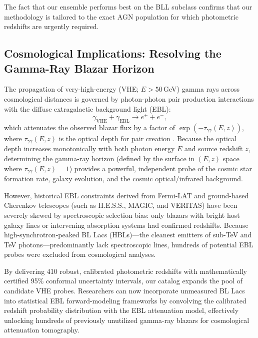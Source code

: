 \documentclass[twocolumn,linenumbers,floatfix]{aastex701}
\begin{document}
The fact that our ensemble performs best on the BLL subclass confirms that our methodology is tailored to the exact AGN population for which photometric redshifts are urgently required.

\subsection{Cosmological Implications: Resolving the Gamma-Ray Blazar Horizon}
\label{subsec:ebl_implications}

The propagation of very-high-energy (VHE; $E > 50$\,GeV) gamma rays across cosmological distances is governed by photon-photon pair production interactions with the diffuse extragalactic background light (EBL):
\begin{equation}
\gamma_{\text{VHE}} + \gamma_{\text{EBL}} \to e^+ + e^-,
\end{equation}
which attenuates the observed blazar flux by a factor of $\exp(-\tau_{\gamma\gamma}(E, z))$, where $\tau_{\gamma\gamma}(E, z)$ is the optical depth for pair creation \citep{Gould1967, Dominguez2011, Biteau2015}. Because the optical depth increases monotonically with both photon energy $E$ and source redshift $z$, determining the gamma-ray horizon (defined by the surface in $(E, z)$ space where $\tau_{\gamma\gamma}(E, z) = 1$) provides a powerful, independent probe of the cosmic star formation rate, galaxy evolution, and the cosmic optical/infrared background.

However, historical EBL constraints derived from Fermi-LAT and ground-based Cherenkov telescopes (such as H.E.S.S., MAGIC, and VERITAS) have been severely skewed by spectroscopic selection bias: only blazars with bright host galaxy lines or intervening absorption systems had confirmed redshifts. Because high-synchrotron-peaked BL Lacs (HBLs)---the cleanest emitters of sub-TeV and TeV photons---predominantly lack spectroscopic lines, hundreds of potential EBL probes were excluded from cosmological analyses. 

By delivering 410 robust, calibrated photometric redshifts with mathematically certified 95\% conformal uncertainty intervals, our catalog expands the pool of candidate VHE probes. Researchers can now incorporate unmeasured BL Lacs into statistical EBL forward-modeling frameworks by convolving the calibrated redshift probability distribution with the EBL attenuation model, effectively unlocking hundreds of previously unutilized gamma-ray blazars for cosmological attenuation tomography.
\end{document}
